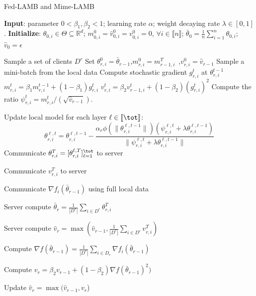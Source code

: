 \documentclass[nohyperref]{article}
\theoremstyle{plain}
\theoremstyle{definition}
\theoremstyle{remark}
\begin{document}
\begin{algorithm}[t]
\caption{ \colorbox{blue!20!white}{Fed-LAMB} and \colorbox{green!20!white}{Mime-LAMB} } \label{alg:ldams}
\begin{algorithmic}[1]
\STATE \textbf{Input}: parameter $0< \beta_1, \beta_2 <1$; learning rate $\alpha$; weight decaying rate $\lambda \in [0,1]$.
\STATE \textbf{Initialize}: $\theta_{0,i} \in \Theta \subseteq \mathbb R^d $; $m^0_{0,i}=\hat v^0_{0,i}=v^0_{0,i} = 0$, $\forall i\in \llbracket n\rrbracket$; $\bar{\theta}_0 =  \frac{1}{n} \sum_{i=1}^n \theta_{0,i}$; $\hat v_0=\epsilon$

\STATE Sample a set of clients $D^r$
\STATE Set $\theta_{r,i}^{0} = \bar{\theta}_{r-1}$,\quad $m^{0}_{r,i} = m^T_{r-1,i}$\ ,\quad $v^{0}_{r,i} = \hat{v}_{r-1}$
\STATE Sample a mini-batch from the local data
\STATE Compute stochastic gradient $g^t_{r,i}$ at $\theta_{r,i}^{t-1}$
\STATE $m^t_{r,i} = \beta_1 m^{t-1}_{r,i} + (1 - \beta_1) g^t_{r,i}$
\STATE \colorbox{blue!20!white}{$v^{t}_{r,i} = \beta_2 v^{t}_{r-1,i} + (1 - \beta_2) (g^t_{r,i})^2$ }
\STATE Compute the ratio  $\psi_{r,i}^t=m^{t}_{r,i}/(\sqrt{\hat v_{r-1}})$. \label{line:scale}

\STATE \label{line:layer} Update local model for each layer $\ell \in \llbracket \tot \rrbracket$: 
\begin{equation}\label{eq:updatelayer}
    \theta_{r,i}^{\ell,t}=\theta_{r,i}^{\ell,t-1}-\frac{\alpha_{r}\phi(\|\theta_{r,i}^{\ell,t-1}\|)(\psi_{r,i}^{\ell,t}+\lambda \theta_{r,i}^{\ell,t-1})}{\|\psi_{r,i}^{\ell,t}+\lambda \theta_{r,i}^{\ell,t-1}\|} 
\end{equation} 
\ENDFOR
\STATE Communicate $\theta_{r,i}^{T} = [\theta_{r,i}^{\ell,T}]_{\ell =1}^{\tot}$ to server

\STATE \colorbox{blue!20!white}{Communicate $v_{r,i}^T$ to server}

\STATE \colorbox{green!20!white}{Communicate $\nabla f_i(\bar\theta_{r-1})$ using full local data}

\ENDFOR
\STATE Server compute $\bar{\theta}_r = \frac{1}{|D^{r}|} \sum_{i \in D^{r}} \theta_{r,i}^{T}$

\STATE \colorbox{blue!20!white}{Server compute $\hat{v}_{r} = \max( \hat{v}_{r-1},\frac{1}{|D^{r}|} \sum_{i \in D^{r}} v^T_{r,i} )$}

\STATE \colorbox{green!20!white}{Compute $\nabla f(\bar \theta_{r-1})=\frac{1}{|D^r|}\sum_{i\in D_r}\nabla f_i(\bar \theta_{r-1})$}

\STATE \colorbox{green!20!white}{Compute $v_r = \beta_2 v_{r-1}+(1-\beta_2)\nabla f(\bar \theta_{r-1})^2)$}

\STATE \colorbox{green!20!white}{Update $\hat v_{r}=\max(\hat v_{r-1},v_r$)}

\ENDFOR
\end{algorithmic}

\end{algorithm}
\vspace{-0.1in}
\end{document}
